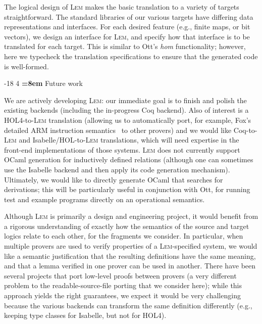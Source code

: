 \documentclass[a4paper]{llncs}
\makeatletter
\renewcommand{\section}{\vspace*{-2mm}\@startsection{section}{1}{\z@}%
                       {-18\p@ \@plus -4\p@ \@minus -4\p@}%
                       {4\p@ \@plus 2\p@ \@minus 2\p@}%
                       {\normalfont\large\bfseries\boldmath
                        \rightskip=\z@ \@plus 8em\pretolerance=10000 }}
\newcommand{\toolname}{\textsc{Lem}}
\makeatother
\begin{document}
%
%
%
The logical design of \toolname{} makes the basic translation to a
variety of targets straightforward.
%
%
The standard libraries of our various targets have differing data representations
and interfaces.  For each desired feature (e.g., finite maps, or bit vectors), 
we design an interface for \toolname{}, and specify how that interface is 
to be translated for each target.
This is similar to Ott's \emph{hom} functionality; however, 
here we typecheck the translation specifications to ensure that
the generated code is well-formed.




\section{Future work}

We are actively developing \toolname{}: our immediate goal is to
finish and polish the existing backends (including the in-progress Coq backend).
Also of
interest is a HOL4-to-\toolname{} translation (allowing us to
automatically port, for example, Fox's detailed ARM instruction semantics~\cite{anthonyARM}
to other provers) and we 
would like Coq-to-\toolname{} and Isabelle/HOL-to-\toolname{}
translations,
which will need expertise in the front-end implementations of those
systems. 
%
\toolname{} does not currently support OCaml generation for
inductively defined relations (although one can sometimes use the Isabelle backend and then
apply its code generation mechanism).  Ultimately, we would like to directly generate
OCaml that searches for derivations; this will be particularly useful in conjunction with Ott, for
running test and example programs directly on an operational semantics.

Although \toolname{} is primarily a design and engineering project, it
would benefit from a rigorous understanding of exactly how the semantics
of the source and target logics relate to each other, for the
fragments we consider.  In particular, when
multiple provers are used to verify properties of a \toolname{}-specified system,
we would like a semantic justification that the resulting definitions have the
same meaning, and that a lemma verified in one prover can be used in another.
%
There have been several projects that port low-level proofs between
provers (a very different problem to the readable-source-file porting
that we consider here); while
this approach yields the right guarantees, we expect it would be
very challenging because the various backends can transform the same definition
differently (e.g., keeping type classes for Isabelle, but not for HOL4).
\end{document}
